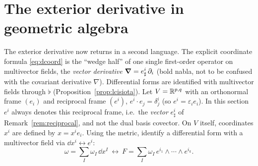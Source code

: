 \section{The exterior derivative in geometric algebra}\label{sec:ga-calculus}

The exterior derivative now returns in a second language. The explicit coordinate formula \eqref{eq:dcoord} is the ``wedge half'' of one single first-order operator on multivector fields, the \emph{vector derivative}
$\boldsymbol{\nabla}=e^i_\sharp\,\partial_i$ (bold nabla, not to be confused with the covariant derivative $\nabla$). Differential forms are identified with multivector fields through $\flat$ (Proposition~\ref{prop:lcisiota}).
Let $V=\mathbb{R}^{p,q}$ with an orthonormal frame $(e_i)$ and reciprocal frame $(e^i)$, $e^i\cdot e_j=\delta^i_j$ (so $e^i=\varepsilon_ie_i$).
In this section $e^i$ always denotes this reciprocal frame, i.e.\ the \emph{vector} $e^i_\sharp$ of Remark~\ref{rem:reciprocal}, and not the dual basis covector. On $V$ itself, coordinates $x^i$ are defined by $x=x^ie_i$. Using the metric, identify a differential form with a multivector field via $\dd x^i\leftrightarrow e^i$:
\[
 \omega=\sum_I\omega_I\,\dd x^I\ \longleftrightarrow\ F=\sum_I\omega_I\,e^{i_1}\wedge\cdots\wedge e^{i_k}.
\]


